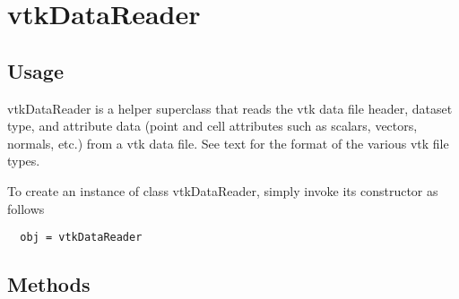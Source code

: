 \section{vtkDataReader}

\subsection{Usage}

 vtkDataReader is a helper superclass that reads the vtk data file header,
 dataset type, and attribute data (point and cell attributes such as
 scalars, vectors, normals, etc.) from a vtk data file.  See text for
 the format of the various vtk file types.


To create an instance of class vtkDataReader, simply
invoke its constructor as follows
\begin{verbatim}
  obj = vtkDataReader
\end{verbatim}
\subsection{Methods}

